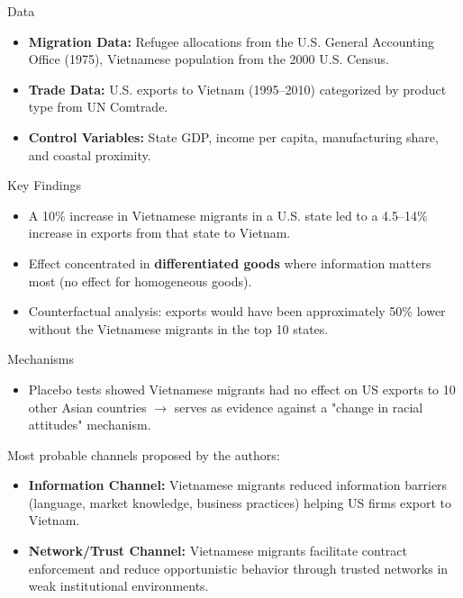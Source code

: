 \documentclass{beamer}
\begin{document}
\begin{frame}{Data}
    \begin{itemize}
        \item \textbf{Migration Data:} Refugee allocations from the U.S. General Accounting Office (1975), Vietnamese population from the 2000 U.S. Census.
        \item \textbf{Trade Data:} U.S. exports to Vietnam (1995–2010) categorized by product type from UN Comtrade.
        \item \textbf{Control Variables:} State GDP, income per capita, manufacturing share, and coastal proximity.
    \end{itemize}
\end{frame}

\begin{frame}{Key Findings}
    \begin{itemize}
        \item A 10\% increase in Vietnamese migrants in a U.S. state led to a 4.5–14\% increase in exports from that state to Vietnam.
       \item Effect concentrated in \textbf{differentiated goods} where information matters most (no effect for homogeneous goods).
        \item Counterfactual analysis: exports would have been approximately 50\% lower without the Vietnamese migrants in the top 10 states.
    \end{itemize}
\end{frame}

\begin{frame}{Mechanisms}
\begin{itemize}
    \item Placebo tests showed Vietnamese migrants had no effect on US exports to 10 other Asian countries $\rightarrow$ serves as evidence against a "change in racial attitudes" mechanism.
\end{itemize}
Most probable channels proposed by the authors:
    \begin{itemize}
        \item \textbf{Information Channel:} Vietnamese migrants reduced information barriers (language, market knowledge, business practices) helping US firms export to Vietnam.
        \item \textbf{Network/Trust Channel:} Vietnamese migrants facilitate contract enforcement and reduce opportunistic behavior through trusted networks in weak institutional environments.
    \end{itemize}
\end{frame}
\end{document}
